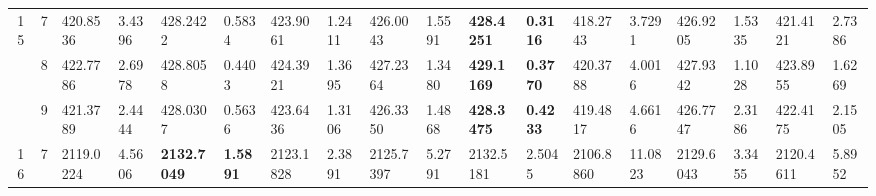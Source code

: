 \documentclass[conference]{IEEEtran}
\begin{document}
\begin{table*}[]
\begin{tabular}{|cc|ll|ll|ll|ll|ll|ll|ll|ll|}
		\multicolumn{1}{|c|}{\multirow{3}{*}{15}}         & 7                               & \multicolumn{1}{l|}{420.8536}          & 3.4396                            & \multicolumn{1}{l|}{428.2422}           & 0.5834                            & \multicolumn{1}{l|}{423.9061}          & 1.2411                            & \multicolumn{1}{l|}{426.0043}          & 1.5591                            & \multicolumn{1}{l|}{\textbf{428.4251}}  & \textbf{0.3116}                   & \multicolumn{1}{l|}{418.2743}          & 3.7291                            & \multicolumn{1}{l|}{426.9205}          & 1.5335                            & \multicolumn{1}{l|}{421.4121}          & 2.7386                            \\ \cline{2-18} 
		\multicolumn{1}{|c|}{}                            & 8                               & \multicolumn{1}{l|}{422.7786}          & 2.6978                            & \multicolumn{1}{l|}{428.8058}           & 0.4403                            & \multicolumn{1}{l|}{424.3921}          & 1.3695                            & \multicolumn{1}{l|}{427.2364}          & 1.3480                            & \multicolumn{1}{l|}{\textbf{429.1169}}  & \textbf{0.3770}                   & \multicolumn{1}{l|}{420.3788}          & 4.0016                            & \multicolumn{1}{l|}{427.9342}          & 1.1028                            & \multicolumn{1}{l|}{423.8955}          & 1.6269                            \\ \cline{2-18} 
		\multicolumn{1}{|c|}{}                            & 9                               & \multicolumn{1}{l|}{421.3789}          & 2.4444                            & \multicolumn{1}{l|}{428.0307}           & 0.5636                            & \multicolumn{1}{l|}{423.6436}          & 1.3106                            & \multicolumn{1}{l|}{426.3350}          & 1.4868                            & \multicolumn{1}{l|}{\textbf{428.3475}}  & \textbf{0.4233}                   & \multicolumn{1}{l|}{419.4817}          & 4.6616                            & \multicolumn{1}{l|}{426.7747}          & 2.3186                            & \multicolumn{1}{l|}{422.4175}          & 2.1505                            \\ \hline
		\multicolumn{1}{|c|}{\multirow{3}{*}{16}}         & 7                               & \multicolumn{1}{l|}{2119.0224}         & 4.5606                            & \multicolumn{1}{l|}{\textbf{2132.7049}} & \textbf{1.5891}                   & \multicolumn{1}{l|}{2123.1828}         & 2.3891                            & \multicolumn{1}{l|}{2125.7397}         & 5.2791                            & \multicolumn{1}{l|}{2132.5181}          & 2.5045                            & \multicolumn{1}{l|}{2106.8860}         & 11.0823                           & \multicolumn{1}{l|}{2129.6043}         & 3.3455                            & \multicolumn{1}{l|}{2120.4611}         & 5.8952                            \\ \cline{2-18} 

\end{tabular}
\end{table*}
\end{document}

